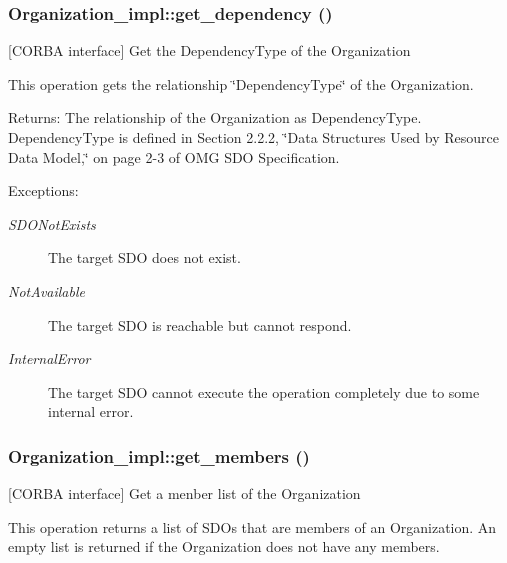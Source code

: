\subsubsection{\setlength{\rightskip}{0pt plus 5cm}Organization\_\-impl::get\_\-dependency ()}\label{classOrganization__impl_Organization__impla12}


[CORBA interface] Get the Dependency\-Type of the Organization 

This operation gets the relationship \char`\"{}Dependency\-Type\char`\"{} of the Organization.

\begin{Desc}
\item[Returns:]The relationship of the Organization as Dependency\-Type. Dependency\-Type is defined in Section 2.2.2, \char`\"{}Data Structures Used by Resource Data Model,\char`\"{} on page 2-3 of OMG SDO Specification. \end{Desc}
\begin{Desc}
\item[Exceptions:]
\begin{description}
\item[{\em SDONot\-Exists}]The target SDO does not exist. \item[{\em Not\-Available}]The target SDO is reachable but cannot respond. \item[{\em Internal\-Error}]The target SDO cannot execute the operation completely due to some internal error.\end{description}
\end{Desc}
\subsubsection{\setlength{\rightskip}{0pt plus 5cm}Organization\_\-impl::get\_\-members ()}\label{classOrganization__impl_Organization__impla8}


[CORBA interface] Get a menber list of the Organization 

This operation returns a list of SDOs that are members of an Organization. An empty list is returned if the Organization does not have any members.

